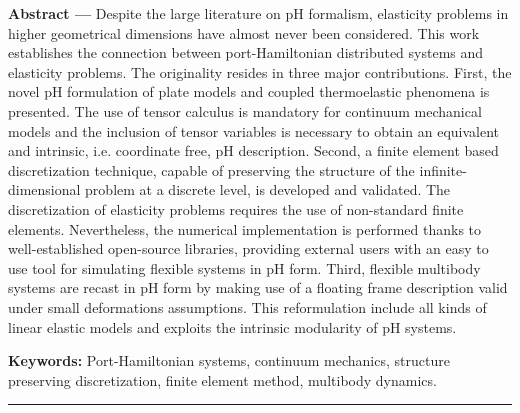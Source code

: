 \begin{vcenterpage}
{\large\textbf{Abstract ---}}  
Despite the large literature on pH formalism, elasticity problems in higher geometrical dimensions have almost never been considered.  This work establishes the connection between port-Hamiltonian distributed systems and elasticity problems. The originality resides in three major contributions. First, the novel pH formulation of plate models and coupled thermoelastic phenomena is presented. The use of tensor calculus is mandatory for continuum mechanical models and the inclusion of tensor variables is necessary to obtain an equivalent and intrinsic, i.e. coordinate free, pH description. Second, a finite element based discretization technique, capable of preserving the structure of the infinite-dimensional problem at a discrete level, is developed and validated. The discretization of elasticity problems requires the use of non-standard finite elements. Nevertheless, the numerical implementation is performed thanks to well-established open-source libraries, providing external users with an easy to use tool for simulating flexible systems in pH form. Third, flexible multibody systems are recast in pH form by making use of a floating frame description valid under small deformations assumptions. This reformulation include all kinds of linear elastic models and exploits the intrinsic modularity of pH systems.

{\large\textbf{Keywords:}}
    Port-Hamiltonian systems, continuum mechanics, structure preserving discretization, finite element method, multibody dynamics.
\\
\noindent\rule[2pt]{\textwidth}{0.5pt}
\end{vcenterpage}

